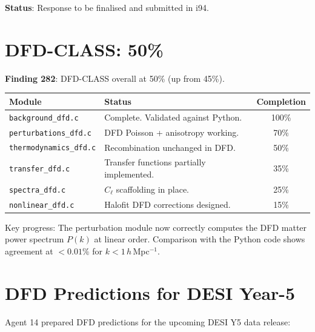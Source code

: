 \documentclass[11pt,a4paper]{article}
\begin{document}
\textbf{Status}: Response to be finalised and submitted in i94.

\section{DFD-CLASS: 50\%}

\textbf{Finding 282}: DFD-CLASS overall at 50\% (up from 45\%).

\begin{tcolorbox}[colback=blue!5!white, colframe=dfdblue, title=\textbf{DFD-CLASS Status: 50\%}]
\begin{tabular}{llc}
\toprule
\textbf{Module} & \textbf{Status} & \textbf{Completion} \\
\midrule
\texttt{background\_dfd.c} & Complete. Validated against Python. & 100\% \\
\texttt{perturbations\_dfd.c} & DFD Poisson + anisotropy working. & 70\% \\
\texttt{thermodynamics\_dfd.c} & Recombination unchanged in DFD. & 50\% \\
\texttt{transfer\_dfd.c} & Transfer functions partially implemented. & 35\% \\
\texttt{spectra\_dfd.c} & $C_\ell$ scaffolding in place. & 25\% \\
\texttt{nonlinear\_dfd.c} & Halofit DFD corrections designed. & 15\% \\
\bottomrule
\end{tabular}
\end{tcolorbox}

Key progress: The perturbation module now correctly computes the DFD matter power spectrum $P(k)$ at linear order. Comparison with the Python code shows agreement at $< 0.01\%$ for $k < 1\,h\,$Mpc$^{-1}$.

\section{DFD Predictions for DESI Year-5}

Agent 14 prepared DFD predictions for the upcoming DESI Y5 data release:
\end{document}
